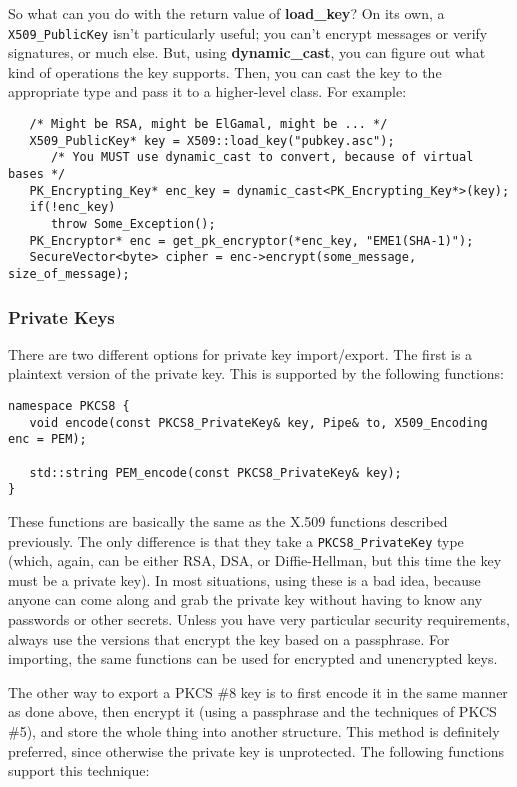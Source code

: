 \documentclass{article}
\newcommand{\function}[1]{\textbf{#1}}
\newcommand{\type}[1]{\texttt{#1}}
\begin{document}
So what can you do with the return value of \function{load\_key}? On
its own, a \type{X509\_PublicKey} isn't particularly useful; you can't
encrypt messages or verify signatures, or much else. But, using
\function{dynamic\_cast}, you can figure out what kind of operations
the key supports. Then, you can cast the key to the appropriate type
and pass it to a higher-level class. For example:

\begin{verbatim}
   /* Might be RSA, might be ElGamal, might be ... */
   X509_PublicKey* key = X509::load_key("pubkey.asc");
      /* You MUST use dynamic_cast to convert, because of virtual bases */
   PK_Encrypting_Key* enc_key = dynamic_cast<PK_Encrypting_Key*>(key);
   if(!enc_key)
      throw Some_Exception();
   PK_Encryptor* enc = get_pk_encryptor(*enc_key, "EME1(SHA-1)");
   SecureVector<byte> cipher = enc->encrypt(some_message, size_of_message);
\end{verbatim}

\subsubsection{Private Keys}

There are two different options for private key import/export. The first is a
plaintext version of the private key. This is supported by the following
functions:

\begin{verbatim}
namespace PKCS8 {
   void encode(const PKCS8_PrivateKey& key, Pipe& to, X509_Encoding enc = PEM);

   std::string PEM_encode(const PKCS8_PrivateKey& key);
}
\end{verbatim}

These functions are basically the same as the X.509 functions described
previously. The only difference is that they take a \type{PKCS8\_PrivateKey}
type (which, again, can be either RSA, DSA, or Diffie-Hellman, but this time
the key must be a private key). In most situations, using these is a bad idea,
because anyone can come along and grab the private key without having to know
any passwords or other secrets. Unless you have very particular security
requirements, always use the versions that encrypt the key based on a
passphrase. For importing, the same functions can be used for encrypted and
unencrypted keys.

The other way to export a PKCS \#8 key is to first encode it in the same manner
as done above, then encrypt it (using a passphrase and the techniques of PKCS
\#5), and store the whole thing into another structure. This method is
definitely preferred, since otherwise the private key is unprotected. The
following functions support this technique:
\end{document}
